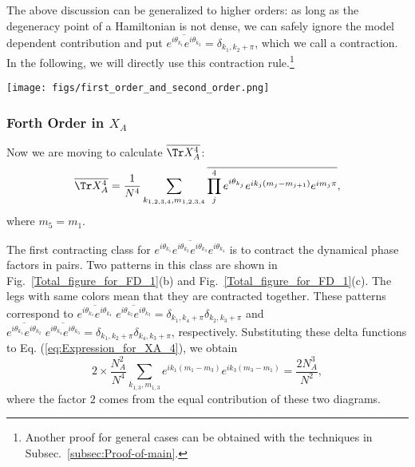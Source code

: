 The above discussion can be generalized to higher orders: as long
as the degeneracy point of a Hamiltonian is not dense, we can safely
ignore the model dependent contribution %
and put $\overline{e^{i\theta_{k_{1}}}e^{i\theta_{k_{2}}}}=\delta_{k_{1},k_{2}+\pi}$,
which we call %
a contraction. In the following, %
we will directly
use this contraction rule.\footnote{Another proof for general cases can be obtained with the techniques in Subsec.~\ref{subsec:Proof-of-main}.}


\begin{figure*}
\texttt{[image: figs/first\_order\_and\_second\_order.png]}
\caption{%
Feynman diagrams for calculating the entanglement entropy order by order. Here each
vertex represents a position index and each leg represents a momentum
index. Each leg is associated with $%
e^{i\theta_{k}}e^{ik(m-m')}e^{i\pi m'}$.
In these diagrams, the legs with same color need to be contracted.
Each color corresponds to one contraction.}
\label{Total_figure_for_FD_1}
\end{figure*}


\subsubsection{Forth Order in $X_{A}$}

Now we are moving to calculate $\overline{\Tr X_{A}^{4}}$:
\begin{equation}
\overline{\Tr X_{A}^{4}}=\frac{1}{N^{4}}\sum_{k_{1,2,3,4},m_{1,2,3,4}}\overline{\prod_{j}^{4}e^{i\theta_{k_{j}}}e^{ik_{j}(m_{j}-m_{j+1})}e^{im_{j}\pi}},
\label{eq:Expression_for_XA_4}
\end{equation}
where $m_{5}=m_{1}$. 

The first contracting class for $\overline{e^{i\theta_{k_{1}}}e^{i\theta_{k_{2}}}e^{i\theta_{k_{3}}}e^{i\theta_{k_{4}}}}$
is to contract the dynamical phase factors in pairs. %
Two patterns in this class are shown
in Fig.~\ref{Total_figure_for_FD_1}(b) and Fig.~\ref{Total_figure_for_FD_1}(c).
The legs with same colors mean that they are contracted together.
These patterns correspond to $\overline{e^{i\theta_{k_{1}}}e^{i\theta_{k_{4}}}}\;\overline{e^{i\theta_{k_{2}}}e^{i\theta_{k_{3}}}}=\delta_{k_{1},k_{4}+\pi}\delta_{k_{2},k_{3}+\pi}$
and $\overline{e^{i\theta_{k_{1}}}e^{i\theta_{k_{2}}}}\;\overline{e^{i\theta_{k_{4}}}e^{i\theta_{k_{3}}}}=\delta_{k_{1},k_{2}+\pi}\delta_{k_{4},k_{3}+\pi}$,
respectively. Substituting these delta functions to Eq. (\ref{eq:Expression_for_XA_4}),
we obtain 
\begin{equation}
2\times\frac{N_{A}^{2}}{N^{4}}\sum_{k_{1,3},m_{1,3}}e^{ik_{1}(m_{1}-m_{3})}e^{ik_{3}(m_{3}-m_{1})}=\frac{2N_{A}^{3}}{N^{2}},
\end{equation}
where the factor $2$ comes from the equal contribution of these two diagrams. 

